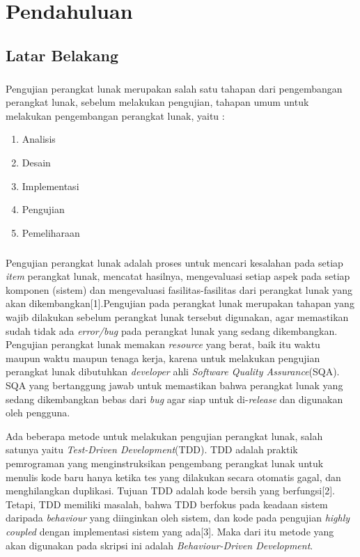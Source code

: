 \chapter{Pendahuluan}
\label{chap:intro}
   
\section{Latar Belakang}
\label{sec:label}
\paragraph{}
Pengujian perangkat lunak merupakan salah satu tahapan dari pengembangan perangkat lunak, sebelum melakukan pengujian, tahapan umum untuk melakukan pengembangan perangkat lunak, yaitu :
\begin{enumerate}
\item Analisis
\item Desain
\item Implementasi
\item Pengujian
\item Pemeliharaan
\end{enumerate}
\paragraph{}
Pengujian perangkat lunak adalah proses untuk mencari kesalahan pada setiap \textit{item} perangkat lunak, mencatat hasilnya, mengevaluasi setiap aspek pada setiap komponen (sistem) dan mengevaluasi fasilitas-fasilitas dari perangkat lunak yang akan dikembangkan[1].Pengujian pada perangkat lunak merupakan tahapan yang wajib dilakukan sebelum perangkat lunak tersebut digunakan, agar memastikan sudah tidak ada \textit{error/bug} pada perangkat lunak yang sedang dikembangkan. Pengujian perangkat lunak memakan \textit{resource} yang berat, baik itu waktu maupun waktu maupun tenaga kerja, karena untuk melakukan pengujian perangkat lunak dibutuhkan \textit{developer} ahli \textit{Software Quality Assurance}(SQA). SQA yang bertanggung jawab untuk memastikan bahwa perangkat lunak yang sedang dikembangkan bebas dari \textit{bug} agar siap untuk di-\textit{release} dan digunakan oleh pengguna.

Ada beberapa metode untuk melakukan pengujian perangkat lunak, salah satunya yaitu \textit{Test-Driven Development}(TDD). TDD adalah praktik pemrograman yang menginstruksikan pengembang perangkat lunak untuk menulis kode baru hanya ketika tes yang dilakukan secara otomatis gagal, dan menghilangkan duplikasi. Tujuan TDD adalah kode bersih yang berfungsi[2]. Tetapi, TDD memiliki masalah, bahwa TDD berfokus pada keadaan sistem daripada \textit{behaviour} yang diinginkan oleh sistem, dan kode pada pengujian \textit{highly coupled} dengan implementasi sistem yang ada[3]. Maka dari itu metode yang akan digunakan pada skripsi ini adalah \textit{Behaviour-Driven Development}.


